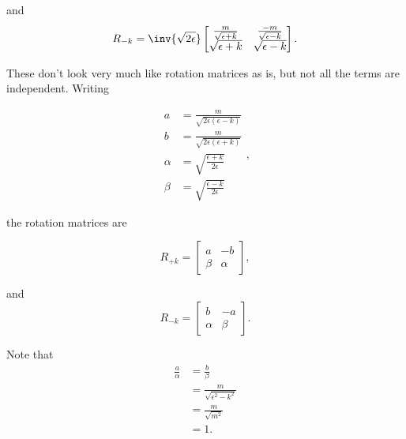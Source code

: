 and
\begin{dmath}\label{eqn:gradQuantumProblemSet4Problem3:280}
R_{-k}
=
\inv{\sqrt{2\epsilon}}
\begin{bmatrix}
\frac{m}{\sqrt{\epsilon + k}} & \frac{-m}{\sqrt{\epsilon - k}} \\
\sqrt{\epsilon + k} & \sqrt{\epsilon - k}
\end{bmatrix}.
\end{dmath}

These don't look very much like rotation matrices as is, but not all the terms are independent.  Writing

\begin{dmath}\label{eqn:gradQuantumProblemSet4Problem3:300}
\begin{aligned}
a &= \frac{m}{\sqrt{2\epsilon(\epsilon - k)}}  \\
b &= \frac{m}{\sqrt{2\epsilon(\epsilon + k)}} \\
\alpha &= \sqrt{\frac{\epsilon + k}{2 \epsilon}}  \\
\beta &= \sqrt{\frac{\epsilon - k}{2 \epsilon}}
\end{aligned},
\end{dmath}

the rotation matrices are

\begin{dmath}\label{eqn:gradQuantumProblemSet4Problem3:320}
R_{+k}
=
\begin{bmatrix}
a & - b \\
\beta & \alpha
\end{bmatrix},
\end{dmath}

and
\begin{dmath}\label{eqn:gradQuantumProblemSet4Problem3:340}
R_{-k}
=
\begin{bmatrix}
b & -a \\
\alpha & \beta
\end{bmatrix}.
\end{dmath}

Note that
\begin{equation}\label{eqn:gradQuantumProblemSet4Problem3:360}
\begin{aligned}
\frac{a}{\alpha} &= \frac{b}{\beta} \\
&= \frac{m}{\sqrt{\epsilon^2 - k^2}}  \\
&= \frac{m}{\sqrt{m^2}}  \\
&= 1.
\end{aligned}
\end{equation}

